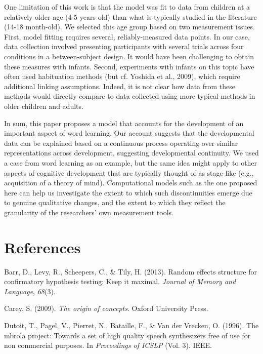 \documentclass[10pt, letterpaper]{article}
\begin{document}
One limitation of this work is that the model was fit to data from
children at a relatively older age (4-5 years old) than what is
typically studied in the literature (14-18 month-old). We selected this
age group based on two measurement issues. First, model fitting requires
several, reliably-measured data points. In our case, data collection
involved presenting participants with several trials across four
conditions in a between-subject design. It would have been challenging
to obtain these measures with infants. Second, experiments with infants
on this topic have often used habituation methods (but cf. Yoshida et
al., 2009), which require additional linking assumptions. Indeed, it is
not clear how data from these methods would directly compare to data
collected using more typical methods in older children and adults.

In sum, this paper proposes a model that accounts for the development of
an important aspect of word learning. Our account suggests that the
developmental data can be explained based on a continuous process
operating over similar representations across development, suggesting
developmental continuity. We used a case from word learning as an
example, but the same idea might apply to other aspects of cognitive
development that are typically thought of as stage-like (e.g.,
acquisition of a theory of mind). Computational models such as the one
proposed here can help us investigate the extent to which such
discontinuities emerge due to genuine qualitative changes, and the
extent to which they reflect the granularity of the researchers' own
measurement tools.

\section{References}\label{references}

\setlength{\parindent}{-0.1in} \setlength{\leftskip}{0.125in} \noindent

\hypertarget{refs}{}
\hypertarget{ref-barr2013}{}
Barr, D., Levy, R., Scheepers, C., \& Tily, H. (2013). Random effects
structure for confirmatory hypothesis testing: Keep it maximal.
\emph{Journal of Memory and Language}, \emph{68}(3).

\hypertarget{ref-carey2009}{}
Carey, S. (2009). \emph{The origin of concepts}. Oxford University
Press.

\hypertarget{ref-dutoit1996}{}
Dutoit, T., Pagel, V., Pierret, N., Bataille, F., \& Van der Vrecken, O.
(1996). The mbrola project: Towards a set of high quality speech
synthesizers free of use for non commercial purposes. In
\emph{Proceedings of ICSLP} (Vol. 3). IEEE.
\end{document}
